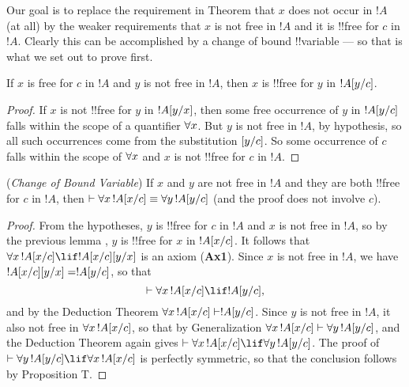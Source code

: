 \documentclass[../../include/open-logic-section]{subfiles}
\begin{document}
Our goal is to replace the requirement in Theorem 
that $x$ does not occur in $!A$ (at all) by the weaker
requirements that $x$ is not free in $!A$ and it is !!{free for} $c$
in $!A$. Clearly this can be accomplished by a change of bound
!!{variable} --- so that is what we set out to prove first. 

\begin{lem}
  If $x$ is free for $c$ in $!A$ and $y$ is not free in
  $!A$, then $x$ is !!{free for} $y$ in $!A[y/c]$.
\end{lem}

\begin{proof}
  If $x$ is not !!{free for} $y$ in $!A[y/x]$, then some
  free occurrence of $y$ in $!A[y/c]$ falls within the
  scope of a quantifier $\lforall[x]$. But $y$ is not free in $!A$,
  by hypothesis, so all such occurrences come from the substitution
  $[y/c]$. So some occurrence of $c$ falls within the scope
  of $\lforall[x]$ and $x$ is not !!{free for} $c$ in $!A$. 
\end{proof}

\begin{lem}
 (\emph{Change of Bound Variable}) If $x$ and $y$ are not
  free in $!A$ and they are both !!{free for} $c$ in $!A$, then
$\Proves \lforall[x][\Subst{!A}{x}{c}] \equiv
\lforall[y][\Subst{!A}{y}{c}]$ (and the proof does not involve $c$).
\end{lem}

\begin{proof}
  From the hypotheses, $y$ is !!{free for} $c$ in $!A$ and $x$ is not
  free in $!A$, so by the previous lemma , $y$ is
!!{free for} $x$ in $!A[x/c]$. It follows that
$\lforall[x][\Subst{!A}{x}{c} \lif \Subst{!A}{x}{c}
  \Subst{}{y}{x}]$ is an axiom (\textbf{Ax1}). Since $x$ is not free
  in $!A$, we have $!A[x/c] [y/x] =
  !A[y/c]$, so that 
  \[
  \Proves \lforall[x][\Subst{!A}{x}{c}] \lif
  \Subst{!A}{y}{c}, 
  \]
  and by the Deduction Theorem $\lforall[x][\Subst{!A}{x}{c}] \Proves
  \Subst{!A}{y}{c}$. Since $y$ is not free in $!A$, it also
  not free in $\lforall[x][\Subst{!A}{x}{c}]$, so that by
Generalization $\lforall[x][\Subst{!A}{x}{c}] \Proves
\lforall[y][\Subst{!A}{y}{c}]$, and the Deduction Theorem again gives
$\Proves \lforall[x][\Subst{!A}{x}{c}] \lif \lforall[y][\Subst{!A}{y}{c}]$.
  The proof of $\Proves \lforall[y][\Subst{!A}{y}{c}] \lif \lforall[x]
  [\Subst{!A}{x}{c}]$ is perfectly symmetric, so that the
  conclusion follows by Proposition T.
\end{proof}
\end{document}
